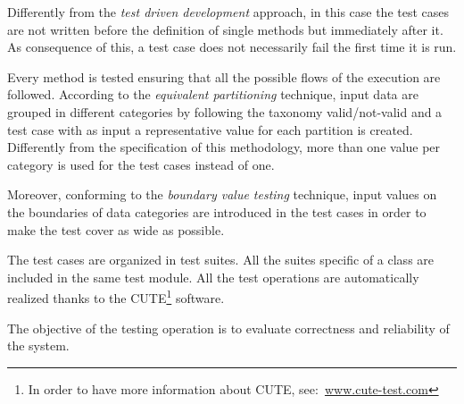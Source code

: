 	Differently from the \emph{test driven development} approach, in this case the test cases are not written before the definition of single methods but immediately after it.
	As consequence of this, a test case does not necessarily fail the first time it is run. 
	
	Every method is tested ensuring that all the possible flows of the execution are followed.
	According to the \emph{equivalent partitioning} technique, input data are grouped in different categories by following the taxonomy valid/not-valid and a test case with as input a representative value for each partition is created. 
	Differently from the specification of this methodology, more than one value per category is used for the test cases instead of one.

	Moreover, conforming to the \emph{boundary value testing} technique, input values on the boundaries of data categories are introduced in the test cases in order to make the test cover as wide as possible. 

	The test cases are organized in test suites. All the suites specific of a class are included in the same test module. 
	All the test operations are automatically realized thanks to the CUTE\footnote{In order to have more information about CUTE, see:~\url{www.cute-test.com}} software.

	The objective of the testing operation is to evaluate correctness and reliability of the system.



